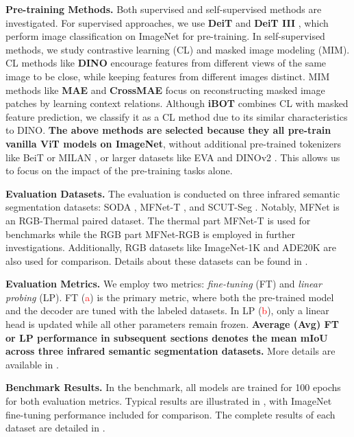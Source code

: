 \textbf{Pre-training Methods.} Both supervised and self-supervised methods are investigated. For supervised approaches, we use \textbf{DeiT} \citep{deit} and \textbf{DeiT III} \citep{deit3}, which perform image classification on ImageNet for pre-training. In self-supervised methods, we study contrastive learning (CL) and masked image modeling (MIM). CL methods like \textbf{DINO} \citep{dino} encourage features from different views of the same image to be close, while keeping features from different images distinct. MIM methods like \textbf{MAE} \citep{mae} and \textbf{CrossMAE} \citep{crossmae} focus on reconstructing masked image patches by learning context relations. Although \textbf{iBOT} \citep{iBOT} combines CL with masked feature prediction, we classify it as a CL method due to its similar characteristics to DINO. \textbf{The above methods are selected because they all pre-train vanilla ViT models on ImageNet}, without additional pre-trained tokenizers like BeiT \citep{beit} or MILAN \citep{milan}, or larger datasets like EVA \citep{eva} and DINOv2 \citep{dinov2}. This allows us to focus on the impact of the pre-training tasks alone.

\textbf{Evaluation Datasets.} The evaluation is conducted on three infrared semantic segmentation datasets: SODA \citep{soda}, MFNet-T \citep{mfnet}, and SCUT-Seg \citep{mcnet}. Notably, MFNet is an RGB-Thermal paired dataset. The thermal part MFNet-T is used for benchmarks while the RGB part MFNet-RGB is employed in further investigations. Additionally, RGB datasets like ImageNet-1K \citep{imagenet} and ADE20K \citep{ade20k} are also used for comparison. Details about these datasets can be found in .

\textbf{Evaluation Metrics.} We employ two metrics: \textit{fine-tuning} (FT) and \textit{linear probing} (LP). FT (\textcolor{red}{a}) is the primary metric, where both the pre-trained model and the decoder are tuned with the labeled datasets. In LP (\textcolor{red}{b}), only a linear head is updated while all other parameters remain frozen. \textbf{Average (Avg) FT or LP performance in subsequent sections denotes the mean mIoU across three infrared semantic segmentation datasets.} More details are available in .

\textbf{Benchmark Results.} In the benchmark, all models are trained for 100 epochs for both evaluation metrics. Typical results are illustrated in , with ImageNet \citep{imagenet} fine-tuning performance included for comparison. The complete results of each dataset are detailed in . 




